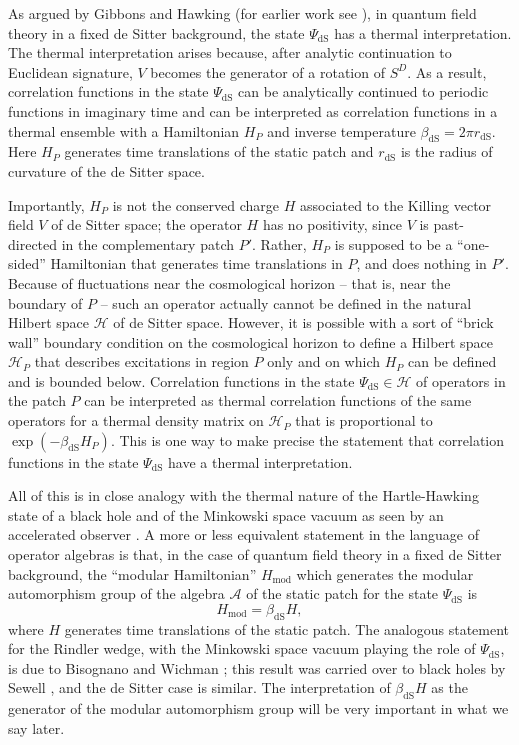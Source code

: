 \documentclass[11pt,a4paper]{article}
\def\mod{{\mathrm{mod}}}
\def\be{\begin{equation}}
\def\ee{\end{equation}}
\def\A{{\mathcal A}}
\def\H{{\mathcal H}}
\def\dS{{\mathrm{dS}}}
\begin{document}
  As argued by Gibbons and Hawking \cite{GH} (for earlier work see \cite{FHN}), in quantum field theory in a fixed de Sitter background,
the state $\Psi_\dS$ has a thermal interpretation.   The thermal interpretation arises because, after analytic continuation
to Euclidean signature, $V$ becomes the generator of a rotation of  $S^D$.    As a result, correlation functions in the state
$\Psi_\dS$ can be analytically continued to periodic functions in imaginary time and can be interpreted 
as correlation functions in a thermal ensemble with a Hamiltonian $H_P$ and inverse temperature $\beta_\dS=2\pi r_\dS$.  Here $H_P$ generates time 
translations of the static patch and 
$r_\dS$ is the radius of curvature of the de Sitter space.  

 Importantly, $H_P$ is not the conserved charge $H$ associated to the Killing vector field
$V$ of de Sitter space; the operator $H$ has no positivity, since $V$ is past-directed in the complementary patch $P'$.   Rather, $H_P$ is supposed
to be a ``one-sided'' Hamiltonian that generates time translations in $P$, and does nothing in $P'$.   Because of fluctuations near the cosmological horizon
-- that is, near the boundary of $P$ -- such an operator actually cannot be defined in the natural
Hilbert space $\H$ of de Sitter space.   However, 
it is possible with a sort of ``brick wall'' boundary condition on the cosmological horizon to define a Hilbert space
$\H_P$ that describes excitations in region $P$ only and on which $H_P$ can be defined and is bounded below.   Correlation functions in the state $\Psi_\dS\in\H$ 
 of operators in the
patch $P$ can be interpreted as thermal correlation functions of the same operators for a thermal density matrix on $\H_P$ that is proportional to
$\exp(-\beta_\dS H_P)$.   This is one way to make precise the statement that correlation functions in the state $\Psi_\dS$ have a thermal
interpretation.  

All of this is in close analogy with the thermal nature of the Hartle-Hawking state of a 
black hole \cite{HH,I} and of the Minkowski space vacuum  as seen by an accelerated observer   \cite{Unruh}.
 A more or less equivalent  statement in the language of operator algebras is that, in the case of quantum field theory in a fixed de Sitter background,
 the ``modular Hamiltonian'' $H_\mod$ which
 generates the modular
automorphism group of the algebra $\A$ of the static patch for the state $\Psi_\dS$ is
\be\label{modham}H_\mod=\beta_\dS H,\ee
where $H$ generates time translations of the static patch.   
The analogous statement for the Rindler wedge, with the Minkowski space vacuum playing the
role of $\Psi_\dS$, is due to Bisognano and Wichman \cite{BW}; this result was carried over to black holes by Sewell \cite{Sewell},
and the de Sitter case is similar.   The interpretation of $\beta_\dS H$ as the generator of the modular automorphism group will be very important in what we say later.
\end{document}
